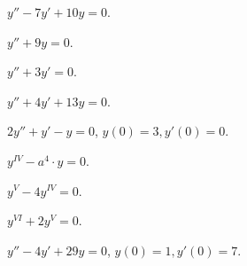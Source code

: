 \begin{problem}
	$y'' - 7 y' + 10 y = 0$.
\end{problem}

\begin{problem}
	$y'' + 9 y = 0$.
\end{problem}

\begin{problem}
	$y'' + 3 y' = 0$.
\end{problem}

\begin{problem}
	$y'' + 4 y' + 13 y = 0$.
\end{problem}

\begin{problem}
	$2 y'' + y' - y = 0$, $y(0) = 3, y'(0) = 0$.
\end{problem}

\begin{problem}
	$y^{IV} - a^4 \cdot y = 0$.
\end{problem}

\begin{problem}
	$y^V - 4 y^{IV} = 0$.
\end{problem}

\begin{problem}
	$y^{VI} + 2 y^V = 0$.
\end{problem}

\begin{problem}
	$y'' - 4 y' + 29 y = 0$, $y(0) = 1, y'(0) = 7$.
\end{problem}
